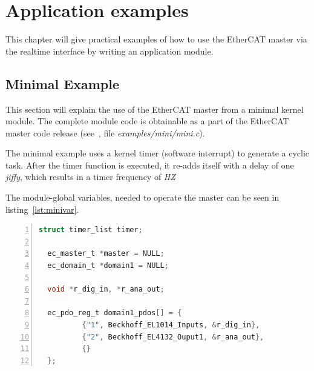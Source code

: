 \documentclass[a4paper,12pt,BCOR6mm,bibtotoc,idxtotoc]{scrbook}
\begin{document}

\chapter{Application examples}
\label{chapter:examples}

This chapter will give practical examples of how to use the EtherCAT master via
the realtime interface by writing an application module.


\section{Minimal Example}
\label{sec:mini}

This section will explain the use of the EtherCAT master from a minimal kernel
module. The complete module code is obtainable as a part of the EtherCAT master
code release (see~\cite{etherlab}, file \textit{examples/mini/mini.c}).

The minimal example uses a kernel timer (software interrupt) to generate a
cyclic task. After the timer function is executed, it re-adds itself with a
delay of one \textit{jiffy}, which results in a timer frequency
of \textit{HZ}

The module-global variables, needed to operate the master can be seen
in listing~\ref{lst:minivar}.

\begin{lstlisting}[gobble=2,language=C,numbers=left,caption={Minimal
    variables},label=lst:minivar]
  struct timer_list timer;

  ec_master_t *master = NULL;
  ec_domain_t *domain1 = NULL;

  void *r_dig_in, *r_ana_out;

  ec_pdo_reg_t domain1_pdos[] = {
          {"1", Beckhoff_EL1014_Inputs, &r_dig_in},
          {"2", Beckhoff_EL4132_Ouput1, &r_ana_out},
          {}
  };
\end{lstlisting}
\end{document}
